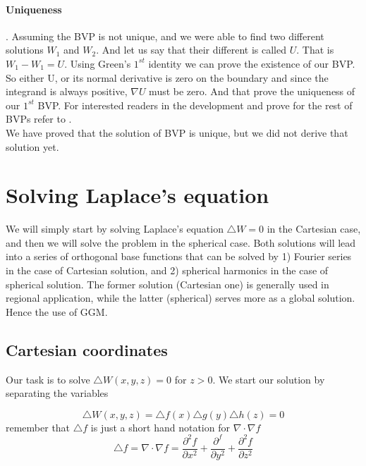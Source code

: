 \paragraph{Uniqueness}. Assuming the BVP is not unique, and we were able to find two different solutions $W_1$ and $W_2$. And let us say that their different is called $U$. That is $W_1 - W_1 = U$. Using Green's $1^{st}$ identity we can prove the existence of our BVP.
\\
So either U, or its normal derivative is zero on the boundary and since the integrand is always positive, $\nabla U$ must be zero.
And that prove the uniqueness of our $1^{st}$ BVP. For interested readers in the development and prove for the rest of BVPs refer to \cite{lndrem}.  
\\
We have proved that the solution of BVP is unique, but we did not derive that solution yet.

\section{Solving Laplace's equation}
We will simply start by solving Laplace's equation $\triangle W = 0$ in the Cartesian case, and then we will solve the problem in the spherical case. Both solutions will lead into a series of orthogonal base functions that can be solved by 1) Fourier series in the case of Cartesian solution, and 2) spherical harmonics in the case of spherical solution. The former solution (Cartesian one) is generally used in regional application, while the latter (spherical) serves more as a global solution. Hence the use of GGM.

\subsection{Cartesian coordinates}
Our task is to solve $\triangle W(x, y, z) = 0$ for $z > 0$. We start our solution by separating the variables

\begin{equation}
\triangle W(x, y, z) = \triangle f(x) \triangle g(y) \triangle h(z) = 0
\end{equation}
remember that $\triangle f$ is just a short hand notation for $\nabla \cdot \nabla f$
\begin{displaymath}
\triangle f = \nabla \cdot \nabla f = \frac{\partial^2 f}{\partial x^2} + \frac{\partial^f}{\partial y^2} + \frac{\partial^2 f}{\partial z^2}
\end{displaymath}

